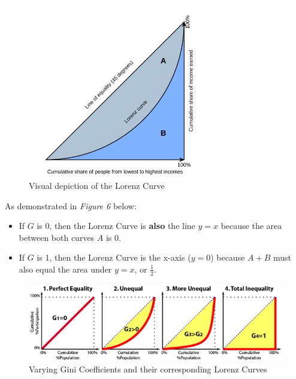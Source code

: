 \documentclass[
  letterpaper,
  DIV=11,
  numbers=noendperiod]{scrartcl}
\providecommand{\tightlist}{%
  \setlength{\itemsep}{0pt}\setlength{\parskip}{0pt}}\usepackage{longtable,booktabs,array}
\begin{document}
\begin{figure}

{\centering \includegraphics[width=0.68\textwidth,height=\textheight]{img/lorenz.png}

}

\caption{Visual depiction of the Lorenz Curve}

\end{figure}

As demonstrated in \emph{Figure 6} below:

\begin{itemize}
\tightlist
\item
  If \(G\) is 0, then the Lorenz Curve is \textbf{also} the line \(y=x\)
  because the area between both curves \(A\) is 0.
\item
  If \(G\) is 1, then the Lorenz Curve is the x-axis (\(y=0\)) because
  \(A+B\) must also equal the area under \(y=x\), or \(\frac{1}{2}\).
\end{itemize}

\begin{figure}

{\centering \includegraphics[width=1\textwidth,height=\textheight]{img/varying-gini.png}

}

\caption{Varying Gini Coefficients and their corresponding Lorenz
Curves}

\end{figure}
\end{document}
